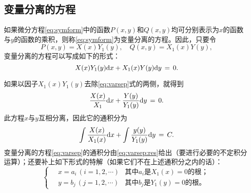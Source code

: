 \subsection{变量分离的方程}
如果微分方程\eqref{eq:symform}中的函数$P(x,y)$和$Q(x,y)$均可分别表示为$x$的函数与$y$的函数的乘积，则称\eqref{eq:symform}为{\heiti 变量分离的方程}。因此，只要令$$P(x,y)=X(x)Y_1(y),\quad Q(x,y)=X_1(x)Y(y),$$变量分离的方程可以写成如下的形式：
\begin{equation}\label{eq:varsep}
X(x)Y_1(y)\mathrm{d} x+X_1(x)Y(y)\mathrm{d} y\,=\,0.
\end{equation}\par
如果以因子$X_1(x)Y_1(y)$去除\eqref{eq:varsep}式的两侧，就得到$$\frac{X(x)}{X_1}\mathrm{d} x+\frac{Y(y)}{Y_1(y)}\mathrm{d} y\,=\,0.$$
此方程$x$与$y$互相分离，因此它的通积分为
\begin{equation}\label{eq:varsep:res}
\int\frac{X(x)}{X_1(x)}\mathrm{d} x+\int\frac{y(y)}{Y_1(y)}\mathrm{d} y\,=\,C.
\end{equation}
变量分离的方程\eqref{eq:varsep}的通积分由\eqref{eq:varsep:res}给出（要进行必要的不定积分运算）；还要补上如下形式的特解（如果它们不在上述通积分之内的话）：
\begin{equation*}
    \begin{cases}
        \quad x=a_i\,(i=1,2,\cdots) & \text{其中$a_i$是$X_1(x)=0$的根；} \\
        \quad y=b_j\,(j=1,2,\cdots) & \text{其中$b_j$是$Y_1(y)=0$的根。}
    \end{cases}
\end{equation*}
